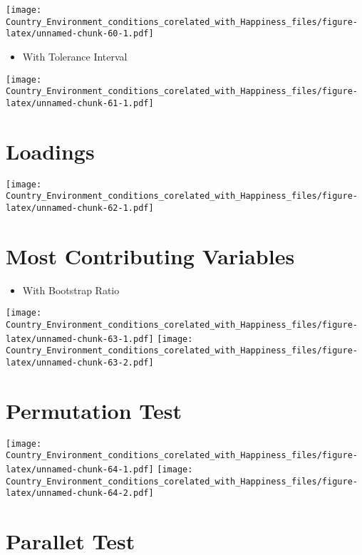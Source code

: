 \documentclass[]{book}
\providecommand{\tightlist}{%
  \setlength{\itemsep}{0pt}\setlength{\parskip}{0pt}}
\begin{document}
\texttt{[image: Country\_Environment\_conditions\_corelated\_with\_Happiness\_files/figure-latex/unnamed-chunk-60-1.pdf]}

\begin{itemize}
\tightlist
\item
  With Tolerance Interval
\end{itemize}

\texttt{[image: Country\_Environment\_conditions\_corelated\_with\_Happiness\_files/figure-latex/unnamed-chunk-61-1.pdf]}

\hypertarget{loadings-2}{%
\section{Loadings}\label{loadings-2}}

\texttt{[image: Country\_Environment\_conditions\_corelated\_with\_Happiness\_files/figure-latex/unnamed-chunk-62-1.pdf]}

\hypertarget{most-contributing-variables-1}{%
\section{Most Contributing
Variables}\label{most-contributing-variables-1}}

\begin{itemize}
\tightlist
\item
  With Bootstrap Ratio
\end{itemize}

\texttt{[image: Country\_Environment\_conditions\_corelated\_with\_Happiness\_files/figure-latex/unnamed-chunk-63-1.pdf]}
\texttt{[image: Country\_Environment\_conditions\_corelated\_with\_Happiness\_files/figure-latex/unnamed-chunk-63-2.pdf]}

\hypertarget{permutation-test-2}{%
\section{Permutation Test}\label{permutation-test-2}}

\texttt{[image: Country\_Environment\_conditions\_corelated\_with\_Happiness\_files/figure-latex/unnamed-chunk-64-1.pdf]}
\texttt{[image: Country\_Environment\_conditions\_corelated\_with\_Happiness\_files/figure-latex/unnamed-chunk-64-2.pdf]}

\hypertarget{parallet-test-2}{%
\section{Parallet Test}\label{parallet-test-2}}
\end{document}
